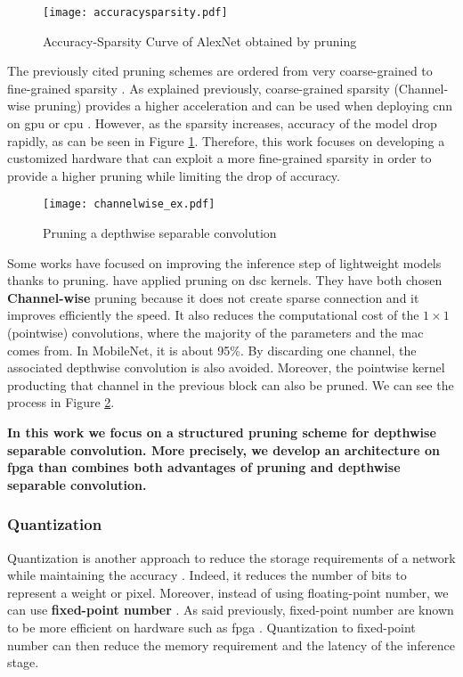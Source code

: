 \begin{figure}
    \centering
    \texttt{[image: accuracysparsity.pdf]}
    \caption{Accuracy-Sparsity Curve of AlexNet obtained by pruning \cite{mao_exploring_2017}}
    \label{fig:pruning-accuracy}
\end{figure}
%
The previously cited pruning schemes are ordered from very coarse-grained to fine-grained sparsity \cite{mao_exploring_2017}. As explained previously, coarse-grained sparsity (Channel-wise pruning) provides a higher acceleration and can be used when deploying \acrshort{cnn} on \acrshort{gpu} or \acrshort{cpu} \cite{mao_exploring_2017, cheng_recent_2018}. However, as the sparsity increases, accuracy of the model drop rapidly, as can be seen in Figure \ref{fig:pruning-accuracy}. Therefore, this work focuses on developing a customized hardware that can exploit a more fine-grained sparsity \cite{mao_exploring_2017} in order to provide a higher pruning while limiting the drop of accuracy.

%
\begin{figure}
    \centering
    \texttt{[image: channelwise\_ex.pdf]}
    \caption{Pruning a depthwise separable convolution \cite{tu_pruning_2019}}
    \label{fig:pruning_dsc}
\end{figure}
Some works have focused on improving the inference step of lightweight models thanks to pruning. \textcite{zhang_channel_2019, tu_pruning_2019} have applied pruning on \acrshort{dsc} kernels. They have both chosen \textbf{Channel-wise} pruning because it does not create sparse connection and it improves efficiently the speed. It also reduces the computational cost of the $1 \times 1$ (pointwise) convolutions, where the majority of the parameters and the \acrshort{mac} comes from. In MobileNet, it is about 95\%. By discarding one channel, the associated depthwise convolution is also avoided.
Moreover, the pointwise kernel producting that channel in the previous block can also be pruned. We can see the process in Figure \ref{fig:pruning_dsc}.

\textbf{In this work we focus on a structured pruning scheme for depthwise separable convolution. More precisely, we develop an architecture on \acrshort{fpga} than combines both advantages of pruning and depthwise separable convolution.}
%
%
\subsubsection{Quantization} \label{subs:quantization}
%
%
Quantization is another approach to reduce the storage requirements of a network while maintaining the accuracy \cite{han_deep_2016}. Indeed, it reduces the number of bits to represent a weight or pixel. Moreover, instead of using floating-point number, we can use \textbf{fixed-point number} \cite{cheng_recent_2018}. As said previously, fixed-point number are known to be more efficient on hardware such as \acrshort{fpga} \cite{david_hardware_2007}. Quantization to fixed-point number can then reduce the memory requirement and the latency of the inference stage.

